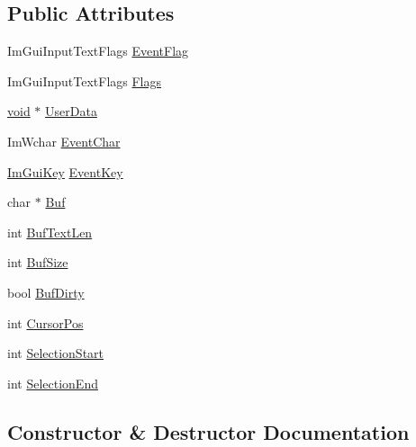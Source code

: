 \subsection*{Public Attributes}
\begin{DoxyCompactItemize}
\item 
Im\+Gui\+Input\+Text\+Flags \hyperlink{structImGuiInputTextCallbackData_a6ad2f8e385c68e56e6682fc0c4e79949}{Event\+Flag}
\item 
Im\+Gui\+Input\+Text\+Flags \hyperlink{structImGuiInputTextCallbackData_aac3133cf2c9d194142481e54192d8fa1}{Flags}
\item 
\hyperlink{imgui__impl__opengl3__loader_8h_ac668e7cffd9e2e9cfee428b9b2f34fa7}{void} $\ast$ \hyperlink{structImGuiInputTextCallbackData_ae8358ea4135032204fcba6c9ada7c49f}{User\+Data}
\item 
Im\+Wchar \hyperlink{structImGuiInputTextCallbackData_a7a6e9a43c5db8f236cde912b913fe707}{Event\+Char}
\item 
\hyperlink{imgui_8h_aa22ffe36b188427d712447ec465203d4}{Im\+Gui\+Key} \hyperlink{structImGuiInputTextCallbackData_a2db52e1da5e8109d4eeb5b0ab22200a9}{Event\+Key}
\item 
char $\ast$ \hyperlink{structImGuiInputTextCallbackData_ac8cd46c3473851c2822aae8240289069}{Buf}
\item 
int \hyperlink{structImGuiInputTextCallbackData_aa4db7629a772cfc3286a5a3fd1e5f1ab}{Buf\+Text\+Len}
\item 
int \hyperlink{structImGuiInputTextCallbackData_a0e391986e9359f6777ab27a3b08229a6}{Buf\+Size}
\item 
bool \hyperlink{structImGuiInputTextCallbackData_aa2d91cca2b46de3f2b218573579f122b}{Buf\+Dirty}
\item 
int \hyperlink{structImGuiInputTextCallbackData_a45b3cc4d7625b1bc38d5b995ca149b43}{Cursor\+Pos}
\item 
int \hyperlink{structImGuiInputTextCallbackData_a72642ac2ce877eaade95386cad70ee8a}{Selection\+Start}
\item 
int \hyperlink{structImGuiInputTextCallbackData_a616bf3a1f0c2d73b9133931f22ab44a7}{Selection\+End}
\end{DoxyCompactItemize}


\subsection{Constructor \& Destructor Documentation}
\mbox{\label{structImGuiInputTextCallbackData_ae19641bad15c1a163928d121075ca09c}} 
